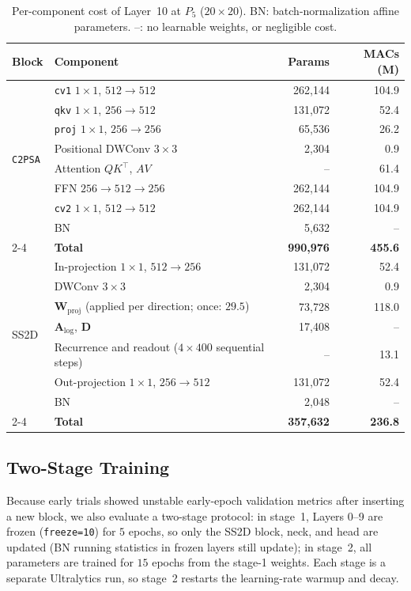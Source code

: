 \begin{table}[t]
\caption{Per-component cost of Layer~10 at $P_5$ ($20 \times 20$). BN: batch-normalization affine parameters. --: no learnable weights, or negligible cost.}
\label{tab:layer10_breakdown}
\centering
\footnotesize
\setlength{\tabcolsep}{4pt}
\begin{tabular}{llrr}
\toprule
\textbf{Block} & \textbf{Component} & \textbf{Params} & \textbf{MACs (M)} \\
\midrule
\multirow{8}{*}{\texttt{C2PSA}} & \texttt{cv1} $1\times1$, $512 \to 512$ & 262,144 & 104.9 \\
 & \texttt{qkv} $1\times1$, $256 \to 512$ & 131,072 & 52.4 \\
 & \texttt{proj} $1\times1$, $256 \to 256$ & 65,536 & 26.2 \\
 & Positional DWConv $3\times3$ & 2,304 & 0.9 \\
 & Attention $QK^{\top}$, $AV$ & -- & 61.4 \\
 & FFN $256 \to 512 \to 256$ & 262,144 & 104.9 \\
 & \texttt{cv2} $1\times1$, $512 \to 512$ & 262,144 & 104.9 \\
 & BN & 5,632 & -- \\
\cmidrule(lr){2-4}
 & \textbf{Total} & \textbf{990,976} & \textbf{455.6} \\
\midrule
\multirow{7}{*}{SS2D} & In-projection $1\times1$, $512 \to 256$ & 131,072 & 52.4 \\
 & DWConv $3\times3$ & 2,304 & 0.9 \\
 & $\mathbf{W}_{\text{proj}}$ (applied per direction; once: $29.5$) & 73,728 & 118.0 \\
 & $\mathbf{A}_{\text{log}}$, $\mathbf{D}$ & 17,408 & -- \\
 & Recurrence and readout ($4 \times 400$ sequential steps) & -- & 13.1 \\
 & Out-projection $1\times1$, $256 \to 512$ & 131,072 & 52.4 \\
 & BN & 2,048 & -- \\
\cmidrule(lr){2-4}
 & \textbf{Total} & \textbf{357,632} & \textbf{236.8} \\
\bottomrule
\end{tabular}
\end{table}

\subsection{Two-Stage Training}
\label{sec:training_workflow}
Because early trials showed unstable early-epoch validation metrics after inserting a new block, we also evaluate a two-stage protocol: in stage~1, Layers 0--9 are frozen (\texttt{freeze=10}) for $5$ epochs, so only the SS2D block, neck, and head are updated (BN running statistics in frozen layers still update); in stage~2, all parameters are trained for $15$ epochs from the stage-1 weights. Each stage is a separate Ultralytics run, so stage~2 restarts the learning-rate warmup and decay.
